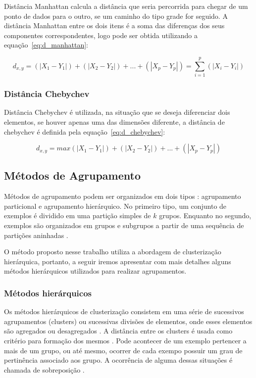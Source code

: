 Distância Manhattan calcula a distância que seria percorrida para chegar de um ponto de dados para o outro, se um caminho do tipo grade for seguido. A distância Manhattan entre os dois itens é a soma das diferenças dos seus componentes correspondentes, logo pode ser obtida utilizando a equação~\ref{eq:d_manhattan}:

\begin{equation}\label{eq:d_manhattan}
	d_{x,y} = (|X_{1}-Y_{1}|)+(|X_{2}-Y_{2}|)+...+(|X_{p}-Y_{p}|) =\sum_{i=1}^{p}(|X_{i}-Y_{i}|)
\end{equation}

\subsubsection{Distância Chebychev}

Distância Chebychev é utilizada, na situação que se deseja diferenciar dois elementos, se houver apenas uma das dimensões diferente, a distância de chebychev é definida pela equação~\ref{eq:d_chebychev}:

\begin{equation}\label{eq:d_chebychev}
	d_{x,y} = max(|X_{1}-Y_{1}|)+(|X_{2}-Y_{2}|)+...+(|X_{p}-Y_{p}|)
\end{equation}

\subsection{Métodos de Agrupamento}

Métodos de agrupamento podem ser organizados em dois tipos \cite{rokach2009survey}: agrupamento particional e agrupamento hierárquico. No primeiro tipo, um conjunto de exemplos é dividido em uma partição simples de $k$ grupos. Enquanto no segundo, exemplos são organizados em grupos e subgrupos a partir de uma sequência de partições aninhadas \cite{RicardoMarcondes:2014}. 

O método proposto nesse trabalho utiliza a abordagem de clusterização hierárquica, portanto, a seguir iremos apresentar com mais detalhes alguns métodos hierárquicos utilizados para realizar agrupamentos.

\subsubsection{Métodos hierárquicos}

Os métodos hierárquicos de clusterização consistem em uma série de sucessivos agrupamentos (clusters) ou sucessivas divisões de elementos, onde esses elementos são agregados ou desagregados \cite{Doni:2004}. A distância entre os clusters é usada como critério para formação dos mesmos \cite{carvalho2009clusterizaccao}. Pode acontecer de um exemplo pertencer a mais de um grupo, ou até mesmo, ocorrer de cada exempo possuir um grau de pertinência associado aos grupo. A ocorrência de alguma dessas situações é chamada de sobreposição \cite{RicardoMarcondes:2014}. 


